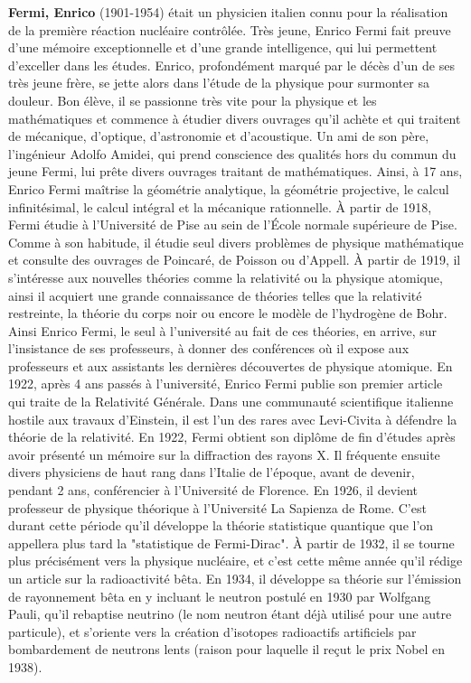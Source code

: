 \textbf{Fermi, Enrico} (1901-1954) était un physicien italien connu pour la réalisation de la première réaction nucléaire contrôlée. Très jeune, Enrico Fermi fait preuve d'une mémoire exceptionnelle et d'une grande intelligence, qui lui permettent d'exceller dans les études. Enrico, profondément marqué par le décès d'un de ses très jeune frère, se jette alors dans l'étude de la physique pour surmonter sa douleur. Bon élève, il se passionne très vite pour la physique et les mathématiques et commence à étudier divers ouvrages qu'il achète et qui traitent de mécanique, d'optique, d'astronomie et d'acoustique. Un ami de son père, l'ingénieur Adolfo Amidei, qui prend conscience des qualités hors du commun du jeune Fermi, lui prête divers ouvrages traitant de mathématiques. Ainsi, à 17 ans, Enrico Fermi maîtrise la géométrie analytique, la géométrie projective, le calcul infinitésimal, le calcul intégral et la mécanique rationnelle. À partir de 1918, Fermi étudie à l'Université de Pise au sein de l'École normale supérieure de Pise. Comme à son habitude, il étudie seul divers problèmes de physique mathématique et consulte des ouvrages de Poincaré, de Poisson ou d'Appell. À partir de 1919, il s'intéresse aux nouvelles théories comme la relativité ou la physique atomique, ainsi il acquiert une grande connaissance de théories telles que la relativité restreinte, la théorie du corps noir ou encore le modèle de l'hydrogène de Bohr. Ainsi Enrico Fermi, le seul à l'université au fait de ces théories, en arrive, sur l'insistance de ses professeurs, à donner des conférences où il expose aux professeurs et aux assistants les dernières découvertes de physique atomique. En 1922, après 4 ans passés à l'université, Enrico Fermi publie son premier article qui traite de la Relativité Générale. Dans une communauté scientifique italienne hostile aux travaux d'Einstein, il est l'un des rares avec Levi-Civita à défendre la théorie de la relativité. En 1922, Fermi obtient son diplôme de fin d'études après avoir présenté un mémoire sur la diffraction des rayons X. Il fréquente ensuite divers physiciens de haut rang dans l'Italie de l'époque, avant de devenir, pendant 2 ans, conférencier à l'Université de Florence. En 1926, il devient professeur de physique théorique à l'Université La Sapienza de Rome. C'est durant cette période qu'il développe la théorie statistique quantique que l'on appellera plus tard la "statistique de Fermi-Dirac". À partir de 1932, il se tourne plus précisément vers la physique nucléaire, et c'est cette même année qu'il rédige un article sur la radioactivité bêta. En 1934, il développe sa théorie sur l'émission de rayonnement bêta en y incluant le neutron postulé en 1930 par Wolfgang Pauli, qu'il rebaptise neutrino (le nom neutron étant déjà utilisé pour une autre particule), et s'oriente vers la création d'isotopes radioactifs artificiels par bombardement de neutrons lents (raison pour laquelle il reçut le prix Nobel en 1938).

